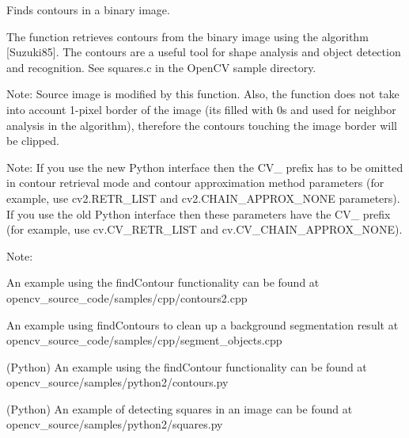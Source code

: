 Finds contours in a binary image.

The function retrieves contours from the binary image using the algorithm \mbox{[}Suzuki85\mbox{]}. The contours are a useful tool for shape analysis and object detection and recognition. See {\ttfamily squares.\+c} in the Open\+CV sample directory.

Note\+: Source {\ttfamily image} is modified by this function. Also, the function does not take into account 1-\/pixel border of the image (it\textquotesingle{}s filled with 0\textquotesingle{}s and used for neighbor analysis in the algorithm), therefore the contours touching the image border will be clipped.

Note\+: If you use the new Python interface then the {\ttfamily C\+V\+\_\+} prefix has to be omitted in contour retrieval mode and contour approximation method parameters (for example, use {\ttfamily cv2.\+R\+E\+T\+R\+\_\+\+L\+I\+ST} and {\ttfamily cv2.\+C\+H\+A\+I\+N\+\_\+\+A\+P\+P\+R\+O\+X\+\_\+\+N\+O\+NE} parameters). If you use the old Python interface then these parameters have the {\ttfamily C\+V\+\_\+} prefix (for example, use {\ttfamily cv.\+C\+V\+\_\+\+R\+E\+T\+R\+\_\+\+L\+I\+ST} and {\ttfamily cv.\+C\+V\+\_\+\+C\+H\+A\+I\+N\+\_\+\+A\+P\+P\+R\+O\+X\+\_\+\+N\+O\+NE}).

Note\+:


\begin{DoxyItemize}
\item An example using the find\+Contour functionality can be found at opencv\+\_\+source\+\_\+code/samples/cpp/contours2.\+cpp 
\item An example using find\+Contours to clean up a background segmentation result at opencv\+\_\+source\+\_\+code/samples/cpp/segment\+\_\+objects.\+cpp 
\item (Python) An example using the find\+Contour functionality can be found at opencv\+\_\+source/samples/python2/contours.\+py 
\item (Python) An example of detecting squares in an image can be found at opencv\+\_\+source/samples/python2/squares.\+py 
\end{DoxyItemize}


